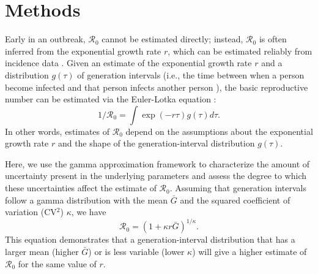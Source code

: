 \documentclass[12pt]{article}
\begin{document}
\section{Methods}

Early in an outbreak, $\mathcal R_0$ cannot be estimated directly;
instead, $\mathcal R_0$ is often inferred from
the exponential growth rate $r$, which can be estimated reliably from incidence data \citep{chowell2003sars, mills2004transmissibility, nishiura2009transmission, nishiura2010pros, ma2014estimating}.
Given an estimate of the exponential growth rate $r$ and a distribution $g(\tau)$ of
generation intervals (i.e., the time between when a person become 
infected and that person infects another person \citep{svensson2007note}), the basic reproductive
number can be estimated via the Euler-Lotka equation \citep{wallinga2007generation}:
\begin{equation}
1/\mathcal R_0 = \int \exp(-r\tau) g(\tau) d\tau.
\end{equation}
In other words, estimates of $\mathcal R_0$
depend on the assumptions about the
exponential growth rate $r$ and the shape of the generation-interval distribution $g(\tau)$.

Here, we use the gamma approximation framework \citep{park2019practical} to characterize the
amount of uncertainty present in the underlying parameters and assess the 
degree to which these uncertainties
affect the estimate of $\mathcal R_0$.
Assuming that generation intervals follow a gamma distribution 
with the mean $\bar G$ and the squared coefficient of variation (CV$^2$) $\kappa$, 
we have
\begin{equation}
\mathcal R_0 = \left(1 + \kappa r \bar{G}\right)^{1/\kappa}.
\label{eq:gamma}
\end{equation}
This equation demonstrates that a generation-interval distribution
that has a larger mean (higher $\bar{G}$) or is less variable (lower $\kappa$)
will give a higher estimate of $\mathcal R_0$ for the same value of $r$.
\end{document}
